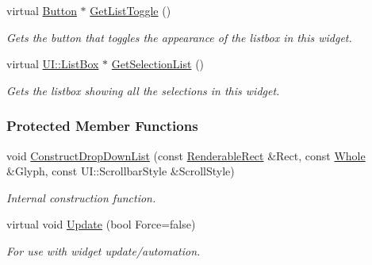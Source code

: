 \begin{DoxyCompactItemize}
virtual \hyperlink{classphys_1_1UI_1_1Button}{Button} $\ast$ \hyperlink{classphys_1_1UI_1_1DropDownList_abfbbeee72ba061a226f64c2ca93a36a9}{GetListToggle} ()
\begin{DoxyCompactList}\small\item\em Gets the button that toggles the appearance of the listbox in this widget. \item\end{DoxyCompactList}\item 
virtual \hyperlink{classphys_1_1UI_1_1ListBox}{UI::ListBox} $\ast$ \hyperlink{classphys_1_1UI_1_1DropDownList_a3b89efdefadc83e7257d34954c0816a6}{GetSelectionList} ()
\begin{DoxyCompactList}\small\item\em Gets the listbox showing all the selections in this widget. \item\end{DoxyCompactList}\end{DoxyCompactItemize}
\subsubsection*{Protected Member Functions}
\begin{DoxyCompactItemize}
\item 
\hypertarget{classphys_1_1UI_1_1DropDownList_a2e0988db883971424579bfc4b8536065}{
void \hyperlink{classphys_1_1UI_1_1DropDownList_a2e0988db883971424579bfc4b8536065}{ConstructDropDownList} (const \hyperlink{structphys_1_1UI_1_1RenderableRect}{RenderableRect} \&Rect, const \hyperlink{namespacephys_a460f6bc24c8dd347b05e0366ae34f34a}{Whole} \&Glyph, const UI::ScrollbarStyle \&ScrollStyle)}
\label{classphys_1_1UI_1_1DropDownList_a2e0988db883971424579bfc4b8536065}

\begin{DoxyCompactList}\small\item\em Internal construction function. \item\end{DoxyCompactList}\item 
\hypertarget{classphys_1_1UI_1_1DropDownList_a1356da2f60b5ca6539f98a957b961d65}{
virtual void \hyperlink{classphys_1_1UI_1_1DropDownList_a1356da2f60b5ca6539f98a957b961d65}{Update} (bool Force=false)}
\label{classphys_1_1UI_1_1DropDownList_a1356da2f60b5ca6539f98a957b961d65}

\begin{DoxyCompactList}\small\item\em For use with widget update/automation. \item\end{DoxyCompactList}\end{DoxyCompactItemize}
